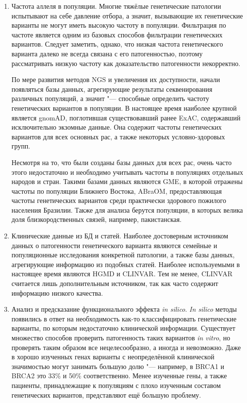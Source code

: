 \documentclass[a4paper,12pt]{article}
\begin{document}
\begin{enumerate}
\item Частота аллеля в популяции.
Многие тяжёлые генетические патологии испытывают на себе давление отбора, а значит, вызывающие их генетические варианты не могут иметь высокую частоту в популяции.
Фильтрация по частоте является одним из базовых способов фильтрации генетических вариантов.
Следует заметить, однако, что низкая частота генетического варианта далеко не всегда связана с его патогенностью, поэтому рассматривать низкую частоту как доказательство патогенности некорректно.

По мере развития методов NGS и увеличения их доступности, начали появляться базы данных, агрегирующие результаты секвенирования различных популяций, а значит "--- способные определить частоту генетических вариантов в популяции.
В настоящее время наиболее крупной является gnomAD\cite{Karczewski_2020}, поглотившая существовавший ранее ExAC, содержавший исключительно экзомные данные.
Она содержит частоты генетических вариантов для всех основных рас, а также некоторых условно-здоровых групп.

Несмотря на то, что были созданы базы данных для всех рас, очень часто этого недостаточно и необходимо учитывать частоты в популяциях отдельных народов и стран.
Такими базами данных являются GME\cite{Scott_2016}, в которой отражены частоты по популяции Ближнего Востока, ABraOM\cite{Naslavsky_2017}, предоставляющая частоты генетических вариантов среди практически здорового пожилого населения Бразилии.
Также для анализа берутся популяции, в которых велика доля близкородственных связей, например, пакистанская\cite{Saleheen_2017}.

\item Клинические данные из БД и статей.
Наиболее достоверным источником данных о патогенности генетического варианта являются семейные и популяционные исследования конкретной патологии, а также базы данных, агрегирующие информацию из подобных статей.
Наиболее используемыми в настоящее время являются HGMD\cite{Stenson_2017} и CLINVAR\cite{Landrum_2017}.
Тем не менее, CLINVAR считается лишь дополнительным источником, так как часто содержит информацию низкого качества\cite{Ryzhkova_2017}.

\item Анализ и предсказание функционального эффекта \textit{in silico}.
\textit{In silico} методы появились в ответ на необходимость как-то классифицировать генетические варианты, по которым недостаточно клинической информации.
Существует множество способов проверить патогенность таких вариантов \textit{in vitro}, но проверять таким образом все нецелесообразно, а иногда и невозможно.
Даже в хорошо изученных генах варианты с неопределённой клинической значимостью могут занимать большую долю "--- например, в BRCA1 и BRCA2 это 33\% и 50\% соответственно.
Менее изученные гены, а также пациенты, принадлежащие к популяциям с плохо изученным составом генетических вариантов, представляют ещё большую проблему.


\end{enumerate}
\end{document}
